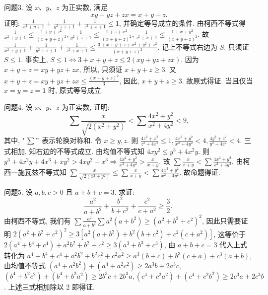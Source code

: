 问题3. 设 $x 、 y 、 z$ 为正实数, 满足
$$
x y+y z+z x=x+y+z .
$$
证明: $\frac{1}{x^2+y+1}+\frac{1}{y^2+z+1}+\frac{1}{z^2+x+1} \leqslant 1$, 并确定等号成立的条件.
由柯西不等式得 $\frac{1}{x^2+y+1} \leqslant \frac{1+y+z^2}{(x+y+z)^2}, \frac{1}{y^2+z+1} \leqslant\frac{1+z+x^2}{(x+y+z)^2}, \frac{1}{z^2+x+1} \leqslant \frac{1+x+y^2}{(x+y+z)^2}$. 故 $\frac{1}{x^2+y+1}+\frac{1}{y^2+z+1}+ \frac{1}{z^2+x+1} \leqslant \frac{3+x+y+z+x^2+y^2+z^2}{(x+y+z)^2}$. 记上不等式右边为 $S$. 只须证 $S \leqslant 1$. 事实上, $S \leqslant 1 \Leftrightarrow 3+x+y+z \leqslant 2(x y+y z+z x)$. 因为 $x+y+z= x y+y z+z x$, 所以, 只须证 $x+y+z \geqslant 3$. 又 $x+y+z=x y+y z+z x \leqslant \frac{(x+y+z)^2}{3}$, 因此, $x+y+z \geqslant 3$. 故原式得证.
当且仅当 $x=y=z=1$ 时, 原式等号成立.



问题4. 设 $x 、 y 、 z$ 为正实数, 证明:
$$
\sum \frac{x}{\sqrt{2\left(x^2+y^2\right)}}<\sum \frac{4 x^2+y^2}{x^2+4 y^2}<9,
$$
其中, " $\sum "$ 表示轮换对称和.
令 $x \geqslant y, z$. 则 $\frac{4 z^2+x^2}{z^2+4 x^2} \leqslant 1, \frac{4 x^2+y^2}{x^2+4 y^2}<4, \frac{4 y^2+z^2}{y^2+4 z^2}<4$. 三式相加, 知右边的不等式成立.
由均值不等式知 $4 x y^2 \leqslant y^3+4 x^2 y$. 则 $y^3+4 x^2 y+ 4 x^3+x y^2>4 x y^2+x^3 \Rightarrow \frac{4 x^2+y^2}{x^2+4 y^2}>\frac{x}{x+y}$. 故 $\sum \frac{x}{x+y}<\sum \frac{4 x^2+y^2}{x^2+4 y^2}$. 由柯西一施瓦兹不等式知 $\sum \frac{x}{\sqrt{2\left(x^2+y^2\right)}} \leqslant \sum \frac{x}{x+y}<\sum \frac{4 x^2+y^2}{x^2+4 y^2}$. 故命题得证.



问题5. 设 $a, b, c>0$ 且 $a+b+c=3$. 求证:
$$
\frac{a^2}{a+b^2}+\frac{b^2}{b+c^2}+\frac{c^2}{c+a^2} \geqslant \frac{3}{2} \text {. }
$$
由柯西不等式, 我们有 $\sum \frac{a^2}{a+b^2} \sum a^2\left(a+b^2\right) \geqslant\left(a^2+b^2+c^2\right)^2$, 因此只需要证明 $2\left(a^2+b^2+c^2\right)^2 \geqslant 3\left[a^2\left(a+b^2\right)+b^2\left(b+c^2\right)+c^2\left(c+a^2\right)\right]$, 这等价于 $2\left(a^4+b^4+c^4\right)+a^2 b^2+b^2+c^2 \geqslant 3\left(a^3+b^3+c^3\right)$, 由 $a+b+c=3$ 代入上式转化为 $a^4+b^4+c^4+a^2 b^2+b^2 c^2+c^2 a^2 \geqslant a^3(b+c)+b^3(c+a)+ c^3(a+b)$, 由均值不等式 $\left(a^4+a^2 b^2\right)+\left(a^4+a^2 c^2\right) \geqslant 2 a^3 b+2 a^3 c$, $\left(b^4+b^2 c^2\right)+\left(b^4+b^2 a^2\right) \geqslant 2 b^3 c+2 b^3 a,\left(c^4+c^2 a^2\right)+\left(c^4+c^2 b^2\right) \geqslant 2 c^3 a+ 2 c^3 b$. 上述三式相加除以 2 即得证.



